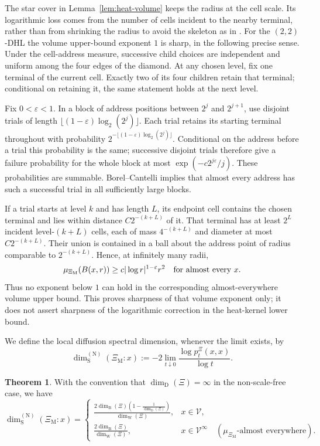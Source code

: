 \documentclass{article}
\theoremstyle{plain}
\theoremstyle{definition}
\newtheorem{theorem}{Theorem}[section]
\newcommand{\dimbox}{\dim_\mathrm{B}}
\newcommand{\dimdeg}{\dim_\mathrm{D}}
\newcommand{\dimwalk}{\dim_\mathrm{W}}
\newcommand{\dimspec}{\dim_\mathrm{S}}
\begin{document}
\begingroup\color{red}
The star cover in Lemma~\ref{lem:heat-volume} keeps the radius at the cell
scale. Its logarithmic loss comes from the number of cells incident to
the nearby terminal, rather than from shrinking the radius to avoid the
skeleton as in \cite{hambly2010diffusion}.
For the $(2,2)$-DHL the volume upper-bound exponent $1$ is sharp, in the
following precise sense. Under the cell-address measure, successive
child choices are independent and uniform among the four edges of the
diamond. At any chosen level, fix one terminal of the current cell.
Exactly two of its four children retain that terminal; conditional on
retaining it, the same statement holds at the next level.

Fix $0<\varepsilon<1$. In a block of address positions between $2^j$
and $2^{j+1}$, use disjoint trials of length
$\lfloor(1-\varepsilon)\log_2(2^j)\rfloor$.
Each trial retains its starting terminal throughout with probability
$2^{-\lfloor(1-\varepsilon)\log_2(2^j)\rfloor}$.
Conditional on the address before a trial this probability is the same;
successive disjoint trials therefore give a failure probability for
the whole block at most $\exp(-c2^{j\varepsilon}/j)$.
These probabilities are summable. Borel--Cantelli implies that almost
every address has such a successful trial in all sufficiently large blocks.

If a trial starts at level $k$ and has length $L$, its endpoint cell
contains the chosen terminal and lies within distance $C2^{-(k+L)}$
of it. That terminal has at least $2^L$ incident level-$(k+L)$ cells,
each of mass $4^{-(k+L)}$ and diameter at most $C2^{-(k+L)}$.
Their union is contained in a ball about the address point of radius
comparable to $2^{-(k+L)}$. Hence, at infinitely many radii,
\[
\mu_{\Xi_{\mathrm M}}(B(x,r))\ge c|\log r|^{1-\varepsilon}r^2
\quad\hbox{for almost every }x.
\]
Thus no exponent below $1$ can hold in the corresponding almost-everywhere
volume upper bound. This proves sharpness of that volume exponent only;
it does not assert sharpness of the logarithmic correction in the
heat-kernel lower bound.
\endgroup{}

We define the local diffusion spectral dimension, whenever the limit exists, by
\[
\dimspec^{(\mathrm N)}(\Xi_{\mathrm M}:x)
:=
-2 \lim_{t \downarrow 0} \frac{\log p_t^\Xi(x,x)}{\log t}.
\]

\begin{theorem}\label{thm:diffusion-spectral}
With the convention that $\dimdeg(\Xi)=\infty$ in the non-scale-free case, we have
\[
\dimspec^{(\mathrm N)}(\Xi_{\mathrm M}:x)
=
\begin{cases}
\displaystyle
\frac{2\dimbox(\Xi)\left(1-\frac{1}{\dimdeg(\Xi)}\right)}{\dimwalk(\Xi)},
&
x \in \mathscr V,
\\[2mm]
\displaystyle
\frac{2\dimbox(\Xi)}{\dimwalk(\Xi)},
&
x \in \mathscr V^\infty
\quad
(\mu_{\Xi_{\mathrm M}}\text{-almost everywhere}).
\end{cases}
\]
\end{theorem}
\end{document}
